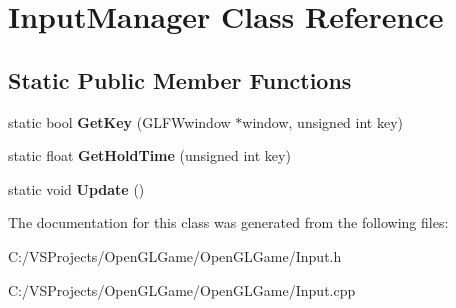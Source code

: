 \hypertarget{class_input_manager}{\section{Input\-Manager Class Reference}
\label{class_input_manager}
}
\subsection*{Static Public Member Functions}
\begin{DoxyCompactItemize}
\item 
\hypertarget{class_input_manager_a2a0fb853e1c72bf06f0869dd03bbe469}{static bool {\bfseries Get\-Key} (G\-L\-F\-Wwindow $\ast$window, unsigned int key)}\label{class_input_manager_a2a0fb853e1c72bf06f0869dd03bbe469}

\item 
\hypertarget{class_input_manager_ab6ce2c01f626911a553f3cf88efbc95b}{static float {\bfseries Get\-Hold\-Time} (unsigned int key)}\label{class_input_manager_ab6ce2c01f626911a553f3cf88efbc95b}

\item 
\hypertarget{class_input_manager_aa5480931dba2720e7d80dd00a53adae0}{static void {\bfseries Update} ()}\label{class_input_manager_aa5480931dba2720e7d80dd00a53adae0}

\end{DoxyCompactItemize}


The documentation for this class was generated from the following files\-:\begin{DoxyCompactItemize}
\item 
C\-:/\-V\-S\-Projects/\-Open\-G\-L\-Game/\-Open\-G\-L\-Game/Input.\-h\item 
C\-:/\-V\-S\-Projects/\-Open\-G\-L\-Game/\-Open\-G\-L\-Game/Input.\-cpp\end{DoxyCompactItemize}
